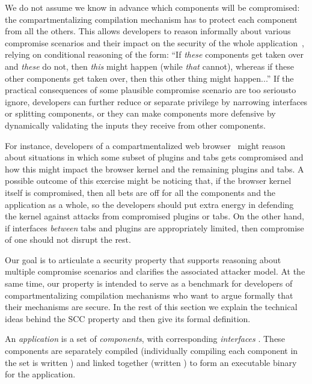 \documentclass[10pt, conference, compsocconf, letterpaper, times]{IEEEtran}
\begin{document}
We do not assume we know in advance which components will be
compromised: the compartmentalizing compilation mechanism has to
protect each component from all the others.
This allows developers to reason informally about various compromise
scenarios and their impact on the security of the whole
application~\cite{GudkaWACDLMNR15}, relying on conditional
reasoning of the form: ``If {\em these} components get taken over and {\em
  these} do not, then {\em this} might happen (while {\em that} cannot),
whereas if these other components get taken over, then this other thing
might happen...''
If the practical consequences of some plausible compromise scenario are too
serious\iffull to ignore\fi,
developers can further reduce or separate privilege by
narrowing interfaces or splitting components, 
or they can make components more defensive by dynamically validating the
inputs they receive from other components.

For instance, developers of a compartmentalized web browser~\cite{ReisG09}
might reason about situations in which some subset of plugins and tabs gets
compromised and how this might impact the browser kernel and the remaining
plugins and tabs.
A possible outcome of this exercise might be noticing that, if the browser
kernel itself is compromised, then all bets are off for all the components
and the application as a whole, so the developers should put extra energy in
defending the kernel against attacks from compromised plugins or tabs.  On
the other hand, if interfaces {\em between} tabs and plugins are
appropriately limited, then compromise of one should not disrupt the rest.

Our goal is to articulate a security property that supports reasoning about
multiple compromise scenarios and clarifies the associated attacker model.
At the same time, our property is intended to serve as a benchmark for
developers of compartmentalizing compilation mechanisms who want to argue
formally that their mechanisms are secure.
In the rest of this section we explain the technical ideas behind the
SCC property and then give its formal definition.

An {\em application} is a set  of {\em components}, with
corresponding {\em interfaces} .
\iffull
{}
\fi
These components are separately compiled (individually compiling each
component in the set  is written ) and linked
together (written ) to form an executable
binary for the application.
\end{document}
